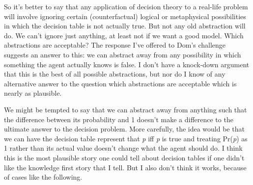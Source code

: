 \documentclass[
  11pt,
  letterpaper,
  DIV=11,
  numbers=noendperiod,
  twoside]{scrartcl}
\begin{document}
So it's better to say that any application of decision theory to a
real-life problem will involve ignoring certain (counterfactual) logical
or metaphysical possibilities in which the decision table is not
actually true. But not any old abstraction will do. We can't ignore just
anything, at least not if we want a good model. Which abstractions are
acceptable? The response I've offered to Dom's challenge suggests an
answer to this: we can abstract away from any possibility in which
something the agent actually knows is false. I don't have a knock-down
argument that this is the best of all possible abstractions, but nor do
I know of any alternative answer to the question which abstractions are
acceptable which is nearly as plausible.

We might be tempted to say that we can abstract away from anything such
that the difference between its probability and 1 doesn't make a
difference to the ultimate answer to the decision problem. More
carefully, the idea would be that we can have the decision table
represent that \emph{p} iff \emph{p} is true and treating Pr(\emph{p})
as 1 rather than its actual value doesn't change what the agent should
do. I think this is the most plausible story one could tell about
decision tables if one didn't like the knowledge first story that I
tell. But I also don't think it works, because of cases like the
following.
\end{document}
